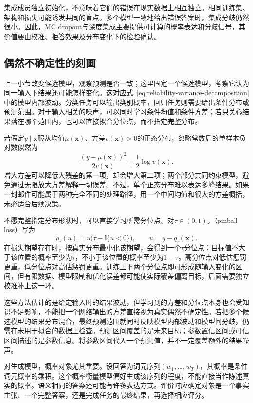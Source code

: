 集成成员独立初始化，不意味着它们的错误在现实数据上相互独立。相同训练集、架构和损失可能诱发共同的盲点。多个模型一致地给出错误答案时，集成分歧仍然很小。因此，MC dropout与深度集成主要提供可计算的概率表达和分歧信号，其价值要由校准、拒答效果及分布变化下的检验确认。

\subsection{偶然不确定性的刻画}
\label{sec:reliability-aleatoric-estimation}

上一小节改变候选模型，观察预测是否一致；这里固定一个候选模型，考察它认为同一输入下结果还可能怎样变化。这对应式~\eqref{eq:reliability-variance-decomposition}中的模型内部波动。分类任务可以输出类别概率，回归任务则需要给出条件分布或预测范围。对于输入相关的噪声，可以同时学习条件均值和条件方差；若只关心结果落在哪个范围内，也可以直接拟合分位点，而不指定完整分布。

若假定$y\mid\bm{x}$服从均值$\mu(\bm{x})$、方差$v(\bm{x})>0$的正态分布，忽略常数后的单样本负对数似然为
\[
 \frac{(y-\mu(\bm{x}))^2}{2v(\bm{x})}
       +\frac12\log v(\bm{x}).
\]
增大方差可以降低大残差的第一项，却会增大第二项；两个部分共同约束模型，避免通过无限放大方差解释一切误差。不过，单个正态分布难以表达多峰结果。如果一封邮件可能属于两种完全不同的处理路径，用一个中间均值和很大的方差概括，未必适合后续决策。

不愿完整指定分布形状时，可以直接学习所需分位点。对$\tau\in(0,1)$，（pinball loss）写为
\[
\rho_\tau(u)=u\bigl(\tau-\mathbb I\{u<0\}\bigr),
 \qquad u=y-q_\tau(\bm{x}).
\]
在损失期望存在时，按真实分布最小化该期望，会得到一个$\tau$分位点：目标值不大于该位置的概率至少为$\tau$，不小于该位置的概率至少为$1-\tau$。高分位点对低估惩罚更重，低分位点对高估惩罚更重。训练上下两个分位点即可形成随输入变化的区间，但有限数据、模型限制和优化误差都可能使实际覆盖偏离目标，后面需要独立校准补上这一环。

这些方法估计的是给定输入时的结果波动，但学习到的方差和分位点本身也会受知识不足影响，不能把一个网络输出的方差直接视为真实偶然不确定性。若把多个候选模型的结果分布混合，最终预测范围就同时反映模型内部波动和模型间分歧，仍需在未用于拟合的数据上检查。预测区间覆盖的是未来目标；参数置信区间或可信区间描述的是参数信息。将参数区间代入一个预测值，并不一定覆盖额外的结果噪声。

对生成模型，概率对象尤其重要。设回答为词元序列$(w_1,\ldots,w_T)$，其概率是条件词元概率的乘积。这个概率衡量模型偏好生成该序列的程度，不能直接当作陈述真实的概率。语义相同的答案还可能有许多表达方式。评价时应确定对象是一个事实主张、一个完整答案，还是完成任务的最终结果，再选择相应评分。


